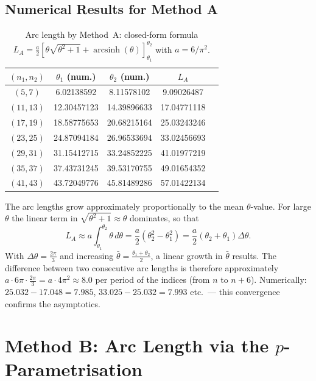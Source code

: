 \subsection{Numerical Results for Method A}

\begin{table}[H]
\centering
\caption{Arc length by Method~A: closed-form formula
  $L_A = \frac{a}{2}[\theta\sqrt{\theta^2+1}+\operatorname{arcsinh}(\theta)]_{\theta_1}^{\theta_2}$
  with $a = 6/\pi^2$.}
\renewcommand{\arraystretch}{1.2}
\begin{tabular}{ccccc}
\toprule
$(n_1, n_2)$ & $\theta_1$ (num.) & $\theta_2$ (num.) & $L_A$ \\
\midrule
$( 5,  7)$ & 6.02138592 &  8.11578102 &  9.09026487 \\
$(11, 13)$ & 12.30457123 & 14.39896633 & 17.04771118 \\
$(17, 19)$ & 18.58775653 & 20.68215164 & 25.03243246 \\
$(23, 25)$ & 24.87094184 & 26.96533694 & 33.02456693 \\
$(29, 31)$ & 31.15412715 & 33.24852225 & 41.01977219 \\
$(35, 37)$ & 37.43731245 & 39.53170755 & 49.01654352 \\
$(41, 43)$ & 43.72049776 & 45.81489286 & 57.01422134 \\
\bottomrule
\end{tabular}
\end{table}

\begin{remark}
The arc lengths grow approximately proportionally to the mean $\theta$-value.
For large $\theta$ the linear term in $\sqrt{\theta^2+1} \approx \theta$
dominates, so that
\[
  L_A \approx a\int_{\theta_1}^{\theta_2}\theta\,d\theta
  = \frac{a}{2}(\theta_2^2 - \theta_1^2)
  = \frac{a}{2}(\theta_2+\theta_1)\Delta\theta.
\]
With $\Delta\theta = \frac{2\pi}{3}$ and increasing
$\bar\theta = \frac{\theta_1+\theta_2}{2}$, a linear growth
in $\bar\theta$ results. The difference between two consecutive
arc lengths is therefore approximately
$a \cdot 6\pi \cdot \frac{2\pi}{3} = a \cdot 4\pi^2 \approx 8.0$ per
period of the indices (from $n$ to $n+6$). Numerically:
$25.032 - 17.048 = 7.985$, $33.025 - 25.032 = 7.993$
etc.\ --- this convergence confirms the asymptotics.
\end{remark}


\section{Method B: Arc Length via the $p$-Parametrisation}
\label{sec:methode_B}

